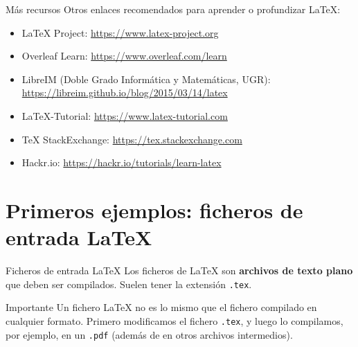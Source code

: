 \documentclass[10pt, xcolor=table]{beamer}
\begin{document}
\begin{frame}{Más recursos}
	Otros enlaces recomendados para aprender o profundizar \LaTeX{}:
	\begin{itemize}
		\item \LaTeX{} Project: \url{https://www.latex-project.org}
		\item Overleaf Learn: \url{https://www.overleaf.com/learn}
		\item LibreIM (Doble Grado Informática y Matemáticas, UGR): \url{https://libreim.github.io/blog/2015/03/14/latex}
		\item LaTeX-Tutorial: \url{https://www.latex-tutorial.com}
		\item TeX StackExchange: \url{https://tex.stackexchange.com}
		\item Hackr.io: \url{https://hackr.io/tutorials/learn-latex}
	\end{itemize}
	
	
	
\end{frame}

\section{Primeros ejemplos: ficheros de entrada \LaTeX{}}

\begin{frame}{Ficheros de entrada \LaTeX{}}
	Los ficheros de \LaTeX{} son \textbf{archivos de texto plano} que deben ser compilados. Suelen tener la extensión \texttt{.tex}.
	\vspace{0.5cm}
	\begin{alertblock}{Importante}
		Un fichero \LaTeX{} no es lo mismo que el fichero compilado en cualquier formato. Primero modificamos el fichero \texttt{.tex}, y luego lo compilamos, por ejemplo, en un \texttt{.pdf} (además de en otros archivos intermedios).
	\end{alertblock}
\end{frame}
\end{document}

